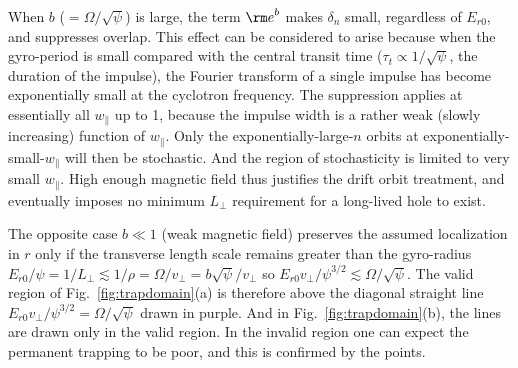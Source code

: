 \documentclass[draft,jgrga]{agutex}
\def\wp{w_\parallel}
\begin{document}
\begin{article}
When $b$ ($=\Omega/\sqrt\psi$) is large, the term ${\rm e}^b$ makes
$\delta_n$ small, regardless of $E_{r0}$, and suppresses overlap. This
effect can be considered to arise because when the gyro-period is
small compared with the central transit time
($\tau_t\propto 1/\sqrt\psi$, the duration of the impulse), the
Fourier transform of a single impulse has become exponentially small
at the cyclotron frequency. The suppression applies at essentially all
$\wp$ up to 1, because the impulse width is a rather weak (slowly
increasing) function of $\wp$. Only the exponentially-large-$n$ orbits
at exponentially-small-$\wp$ will then be stochastic. And the region
of stochasticity is limited to very small $\wp$. High enough
magnetic field thus justifies the drift orbit treatment, and
eventually imposes no minimum $L_\perp$ requirement for a long-lived
hole to exist.

The opposite case $b\ll 1$ (weak magnetic field) preserves the assumed
localization in $r$ only if the transverse length scale remains
greater than the gyro-radius
$E_{r0}/\psi=1/L_\perp\lesssim
1/\rho=\Omega/v_\perp=b\sqrt\psi/v_\perp$
so $E_{r0}v_\perp/\psi^{3/2} \lesssim \Omega/\sqrt\psi$. The valid
region of Fig.\ \ref{fig:trapdomain}(a) is therefore above the
diagonal straight line $E_{r0}v_\perp/\psi^{3/2}= \Omega/\sqrt\psi$
drawn in purple. And in Fig.\ \ref{fig:trapdomain}(b), the lines are
drawn only in the valid region.  In the invalid region one can
expect the permanent trapping to be poor, and this is confirmed by the
points.



\end{article}
\end{document}
